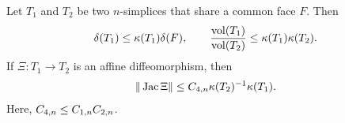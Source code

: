 \documentclass[10pt,letterpaper]{article}
\begin{document}

\begin{lemma}\label{lemma:volumecomparison}
    Let $T_1$ and $T_2$ be two $n$-simplices that share a common face $F$. Then 
    \begin{align*}
        {\delta}(T_1)
        \leq 
        \kappa(T_1)
        {\delta}(F)
        ,
        \qquad 
        \frac{ \operatorname{vol}(T_1) }{ \operatorname{vol}(T_2) }
        \leq 
        \kappa(T_1) \kappa(T_2)
        .
    \end{align*}
    If $\Xi : T_1 \rightarrow T_2$ is an affine diffeomorphism, then 
    \begin{align*}
        \| \operatorname{{\rm Jac}} \Xi \|
        \leq 
        C_{4,n}
        \kappa(T_2)^{-1} \kappa(T_1) 
        .
    \end{align*}
    Here, $C_{4,n} \leq C_{1,n} C_{2,n}$. 
\end{lemma}

    
\end{document}
